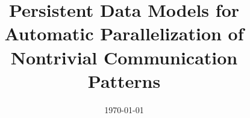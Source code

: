 \documentclass[a4paper, 11pt, oneside]{Thesis}  %
\begin{document}
\frontmatter      %

\title  {Persistent Data Models for Automatic Parallelization of Nontrivial
            Communication Patterns}
\addresses  {\groupname\\\deptname\\\univname}
\date       {\today}
\subject    {}
\keywords   {}

\maketitle


\fancyhead{}        %
\rhead{\thepage}    %
\lhead{}            %

\pagestyle{fancy}   %
\end{document}

